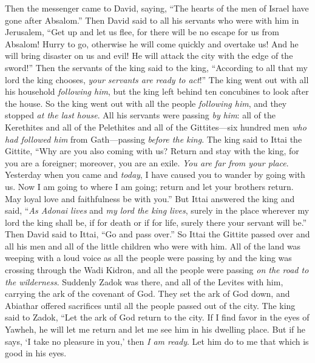 \begin{biblechapter}
 Then the messenger came to David, saying, “The hearts of the men of Israel have gone after Absalom.”
\verse Then David said to all his servants who were with him in Jerusalem, “Get up and let us flee, for there will be no escape for us from Absalom! Hurry to go, otherwise he will come quickly and overtake us! And he will bring disaster on us and evil! He will attack the city with the edge of the sword!”
\verse Then the servants of the king said to the king, “According to all that my lord the king chooses, \textit{your servants are ready to act}!”
\verse The king went out with all his household \textit{following him}, but the king left behind ten concubines to look after the house.
\verse So the king went out with all the people \textit{following him}, and they stopped \textit{at the last house}.
\verse All his servants were passing \textit{by him}: all of the Kerethites and all of the Pelethites and all of the Gittites—six hundred men \textit{who had followed him} from Gath—passing \textit{before the king}.
\verse The king said to Ittai the Gittite, “Why are you also coming with us? Return and stay with the king, for you are a foreigner; moreover, you are an exile. \textit{You are far from your place}.
\verse Yesterday when you came and \textit{today}, I have caused you to wander by going with us. Now I am going to where I am going; return and let your brothers return. May loyal love and faithfulness be with you.”
\verse But Ittai answered the king and said, “\textit{As Adonai lives} and \textit{my lord the king lives}, surely in the place wherever my lord the king shall be, if for death or if for life, surely there your servant will be.”
\verse Then David said to Ittai, “Go and pass over.” So Ittai the Gittite passed over and all his men and all of the little children who were with him.
\verse All of the land was weeping with a loud voice as all the people were passing by and the king was crossing through the Wadi Kidron, and all the people were passing \textit{on the road to the wilderness}.
 Suddenly Zadok was there, and all of the Levites with him, carrying the ark of the covenant of God. They set the ark of God down, and Abiathar offered sacrifices until all the people passed out of the city.
\verse The king said to Zadok, “Let the ark of God return to the city. If I find favor in the eyes of Yawheh, he will let me return and let me see him in his dwelling place.
\verse But if he says, ‘I take no pleasure in you,’ then \textit{I am ready}. Let him do to me that which is good in his eyes.

\end{biblechapter}
